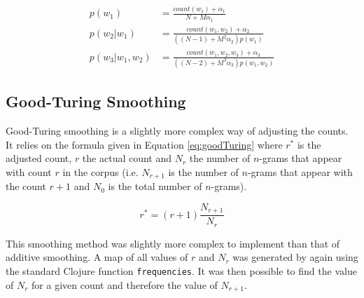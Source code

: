 \begin{subequations}
\begin{align}
p(w_{1})&=\frac{count(w_{1})+\alpha_{1}}{N+M\alpha_{1}} \label{eq:1-gramAdditiveSmoothing}
\\
p(w_{2}| w_{1})&=\frac{count(w_{1}, w_{2})+\alpha_{2}}{((N-1)+M^{2}\alpha_{2})p(w_{1})} \label{eq:2-gramAdditiveSmoothing}
\\
p(w_{3}| w_{1}, w_{2}) &= \frac{count(w_{1}, w_{2}, w_{3})+\alpha_{3}}{((N-2)+M^{3}\alpha_{3})p(w_{1}, w_{2})} \label{eq:3-gramAdditiveSmoothing}
\end{align}
\end{subequations}

%
%

\subsection{Good-Turing Smoothing} \label{sec:goodTuringSmoothing}

Good-Turing smoothing is a slightly more complex way of adjusting the counts. It relies on the formula given in Equation \ref{eq:goodTuring} where $r^{*}$ is the adjusted count, $r$ the actual count and $N_{r}$ the number of $n$-grams that appear with count $r$ in the corpus (i.e. $N_{r+1}$ is the number of $n$-grams that appear with the count $r+1$ and $N_{0}$ is the total number of $n$-grams).

\begin{equation}
r^{*}=(r+1)\frac{N_{r+1}}{N_{r}}
\label{eq:goodTuring}
\end{equation}


This smoothing method was slightly more complex to implement than that of additive smoothing. A map of all values of $r$ and $N_{r}$ was generated by again using the standard Clojure function \lstinline!frequencies!. It was then possible to find the value of $N_{r}$ for a given count and therefore the value of $N_{r+1}$. 


